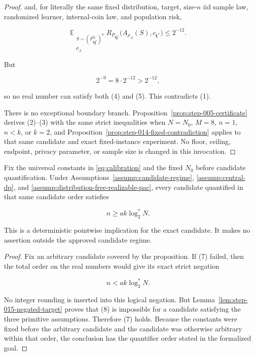 \begin{proof}
and, for literally the same fixed distribution, target, size-\(n\) iid
sample law, randomized learner, internal-coin law, and population risk,

\[
\mathbb E_{\substack{
 S\sim(P_{\boldsymbol Q^*}^{c_{\boldsymbol t^*}})^n\\
 \rho_A}}
R_{P_{\boldsymbol Q^*}}
\bigl(A_{\rho_A}(S),c_{\boldsymbol t^*}\bigr)\le2^{-12}.
\tag{5}
\]

But

\[
2^{-9}=8\cdot2^{-12}>2^{-12},
\tag{6}
\]

so no real number can satisfy both (4) and (5). This contradicts (1).

There is no exceptional boundary branch. Proposition~\ref{prop:step-005-certificate} derives (2)--(3) with the same
strict inequalities when \(N=N_0\), \(M=8\), \(n=1\), \(n<k\), or
\(k=2\), and Proposition~\ref{prop:step-014-fixed-contradiction} applies to that same
candidate and exact fixed-instance experiment. No floor, ceiling, endpoint,
privacy parameter, or sample size is changed in this invocation. \end{proof}

\begin{proposition}\label{prop:step-015-exact-closure}
Fix the universal constants in \eqref{eq:calibration} and the fixed
\(N_0\) before
candidate quantification. Under Assumptions~\ref{assump:candidate-regime},
\ref{assump:central-dp}, and
\ref{assump:distribution-free-realizable-pac}, every candidate quantified
in that same candidate order satisfies

\[
n\ge a k\log_2^*N.
\tag{7}
\]

This is a deterministic pointwise implication for the exact candidate. It
makes no assertion outside the approved candidate regime.
\end{proposition}

\begin{proof}
Fix an arbitrary candidate covered by the proposition. If (7) failed, then
the total order on the real numbers would give its exact strict negation

\[
n<ak\log_2^*N.
\tag{8}
\]

No integer rounding is inserted into this logical negation. But
Lemma~\ref{lem:step-015-negated-target} proves that (8) is impossible for a
candidate satisfying the three primitive assumptions. Therefore (7) holds.
Because the constants were fixed before the arbitrary candidate and the
candidate was otherwise arbitrary within that order, the conclusion has the
quantifier order stated in the formalized goal. \end{proof}
